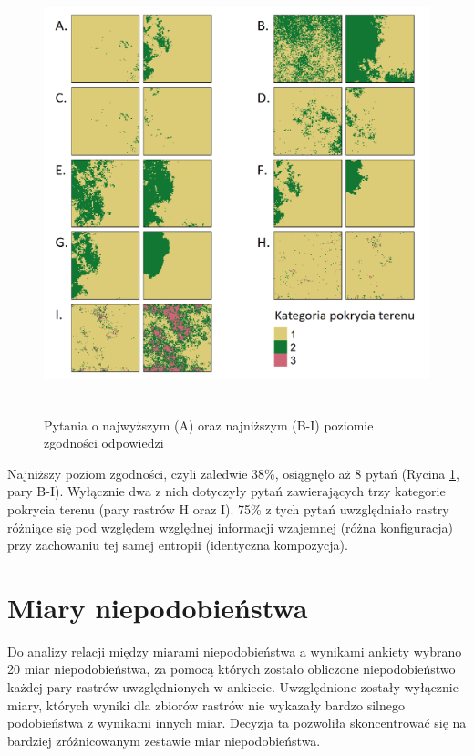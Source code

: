 \documentclass{amuthesis}
\begin{document}
\begin{figure}[t]

{\centering \includegraphics[width=5.20833in,height=5in]{figures/pyt_zgodnosc2_kopia.png}

}

\caption{\label{fig-pyt_zgodnosc2_kopia}Pytania o najwyższym (A) oraz
najniższym (B-I) poziomie zgodności odpowiedzi}

\end{figure}

Najniższy poziom zgodności, czyli zaledwie 38\%, osiągnęło aż 8 pytań
(Rycina \ref{fig-pyt_zgodnosc2_kopia}, pary B-I). Wyłącznie dwa z nich
dotyczyły pytań zawierających trzy kategorie pokrycia terenu (pary
rastrów H oraz I). 75\% z tych pytań uwzględniało rastry różniące się
pod względem względnej informacji wzajemnej (różna konfiguracja) przy
zachowaniu tej samej entropii (identyczna kompozycja).

\hypertarget{miary-niepodobieux144stwa}{%
\section{Miary niepodobieństwa}\label{miary-niepodobieux144stwa}}

Do analizy relacji między miarami niepodobieństwa a wynikami ankiety
wybrano 20 miar niepodobieństwa, za pomocą których zostało obliczone
niepodobieństwo każdej pary rastrów uwzględnionych w ankiecie.
Uwzględnione zostały wyłącznie miary, których wyniki dla zbiorów rastrów
nie wykazały bardzo silnego podobieństwa z wynikami innych miar. Decyzja
ta pozwoliła skoncentrować się na bardziej zróżnicowanym zestawie miar
niepodobieństwa.
\end{document}
